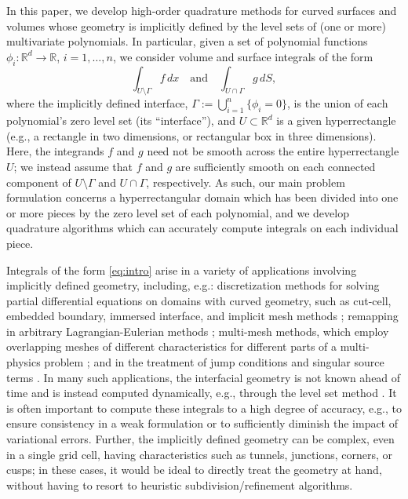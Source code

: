\documentclass[onefignum,onetabnum,onealgnum,oneeqnum]{siamart190516}
\newcommand{\R}{\mathbb R}
\begin{document}
In this paper, we develop high-order quadrature methods for curved surfaces and volumes whose geometry is implicitly defined by the level sets of (one or more) multivariate polynomials. In particular, given a set of polynomial functions $\phi_i: \R^d \to \R$, $i = 1, \ldots, n$, we consider volume and surface integrals of the form
\begin{equation} \label{eq:intro} \int_{U \setminus \Gamma} f\,dx \quad \text{and} \quad \int_{U \cap \Gamma} g\,dS, \end{equation}
where the implicitly defined interface, $\Gamma := \bigcup_{i=1}^n \{ \phi_i = 0 \}$, is the union of each polynomial's zero level set (its ``interface''), and $U \subset \R^d$ is a given hyperrectangle (e.g., a rectangle in two dimensions, or rectangular box in three dimensions). Here, the integrands $f$ and $g$ need not be smooth across the entire hyperrectangle $U$; we instead assume that $f$ and $g$ are sufficiently smooth on each connected component of $U \setminus \Gamma$ and $U \cap \Gamma$, respectively. As such, our main problem formulation concerns a hyperrectangular domain which has been divided into one or more pieces by the zero level set of each polynomial, and we develop quadrature algorithms which can accurately compute integrals on each individual piece.

Integrals of the form \eqref{eq:intro} arise in a variety of applications involving implicitly defined geometry, including, e.g.: discretization methods for solving partial differential equations on domains with curved geometry, such as cut-cell, embedded boundary, immersed interface, and implicit mesh methods \cite{ImplicitMeshPartOne,ImplicitMeshPartTwo,JohanssonLarson,MoesDolbowBelytschko,ChengFries,BurmanClausHansboLarsonMassing}; %
remapping in arbitrary Lagrangian-Eulerian methods \cite{doi:10.1137/17M1116453}; multi-mesh methods, which employ overlapping meshes of different characteristics for different parts of a multi-physics problem \cite{JOHANSSON2019672}; and in the treatment of jump conditions and singular source terms \cite{flame,immersedboundary,Brackbill1992335,DiscacciatiQuarteroniQuinodoz}. %
In many such applications, the interfacial geometry is not known ahead of time and is instead computed dynamically, e.g., through the level set method \cite{OsheSeth,SethBook,OsherBook,LevelSetFluidReview}. It is often important to compute these integrals to a high degree of accuracy, e.g., to ensure consistency in a weak formulation or to sufficiently diminish the impact of variational errors. Further, the implicitly defined geometry can be complex, even in a single grid cell, having characteristics such as tunnels, junctions, corners, or cusps; in these cases, it would be ideal to directly treat the geometry at hand, without having to resort to heuristic subdivision/refinement algorithms. %
\end{document}
